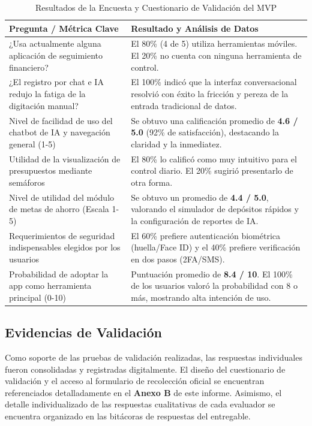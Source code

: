 \documentclass[12pt]{article}
\begin{document}
\begin{table}[H]
\centering
\caption{Resultados de la Encuesta y Cuestionario de Validación del MVP}
\label{tab:resultados_validacion}
\begin{tabular}{p{5.5cm}p{9.3cm}}
\toprule
\textbf{Pregunta / Métrica Clave} & \textbf{Resultado y Análisis de Datos} \\
\midrule
¿Usa actualmente alguna aplicación de seguimiento financiero? & El 80\% (4 de 5) utiliza herramientas móviles. El 20\% no cuenta con ninguna herramienta de control. \\
\addlinespace
¿El registro por chat e IA redujo la fatiga de la digitación manual? & El 100\% indicó que la interfaz conversacional resolvió con éxito la fricción y pereza de la entrada tradicional de datos. \\
\addlinespace
Nivel de facilidad de uso del chatbot de IA y navegación general (1-5) & Se obtuvo una calificación promedio de \textbf{4.6 / 5.0} (92\% de satisfacción), destacando la claridad y la inmediatez. \\
\addlinespace
Utilidad de la visualización de presupuestos mediante semáforos & El 80\% lo calificó como muy intuitivo para el control diario. El 20\% sugirió presentarlo de otra forma. \\
\addlinespace
Nivel de utilidad del módulo de metas de ahorro (Escala 1-5) & Se obtuvo un promedio de \textbf{4.4 / 5.0}, valorando el simulador de depósitos rápidos y la configuración de reportes de IA. \\
\addlinespace
Requerimientos de seguridad indispensables elegidos por los usuarios & El 60\% prefiere autenticación biométrica (huella/Face ID) y el 40\% prefiere verificación en dos pasos (2FA/SMS). \\
\addlinespace
Probabilidad de adoptar la app como herramienta principal (0-10) & Puntuación promedio de \textbf{8.4 / 10}. El 100\% de los usuarios valoró la probabilidad con 8 o más, mostrando alta intención de uso. \\
\bottomrule
\end{tabular}
\end{table}

\subsection{Evidencias de Validación}
Como soporte de las pruebas de validación realizadas, las respuestas individuales fueron consolidadas y registradas digitalmente. El diseño del cuestionario de validación y el acceso al formulario de recolección oficial se encuentran referenciados detalladamente en el \textbf{Anexo B} de este informe. Asimismo, el detalle individualizado de las respuestas cualitativas de cada evaluador se encuentra organizado en las bitácoras de respuestas del entregable.
\end{document}
